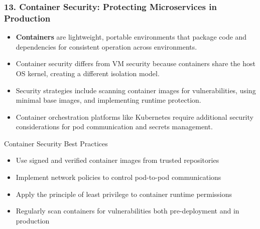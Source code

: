 \documentclass{beamer}
\begin{document}
	\begin{frame}
		\frametitle{13. Container Security: Protecting Microservices in Production}
		\begin{itemize}
			\item \textbf{Containers} are lightweight, portable environments that package code and dependencies for consistent operation across environments.
			\item Container security differs from VM security because containers share the host OS kernel, creating a different isolation model.
			\item Security strategies include scanning container images for vulnerabilities, using minimal base images, and implementing runtime protection.
			\item Container orchestration platforms like Kubernetes require additional security considerations for pod communication and secrets management.
		\end{itemize}
		
		\begin{example}{Container Security Best Practices}
			\scriptsize
			\begin{itemize}
				\item Use signed and verified container images from trusted repositories
				\item Implement network policies to control pod-to-pod communications
				\item Apply the principle of least privilege to container runtime permissions
				\item Regularly scan containers for vulnerabilities both pre-deployment and in production
			\end{itemize}
		\end{example}
	\end{frame}
	
\end{document}
